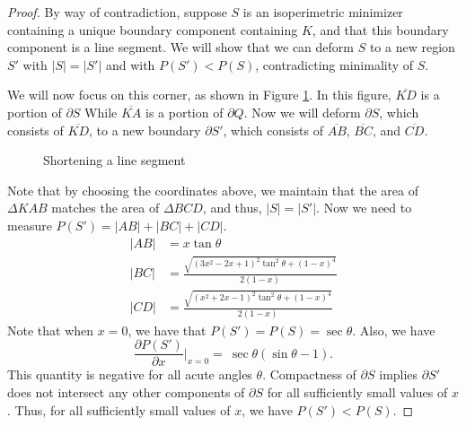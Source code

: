 \documentclass[leqno]{article}
\numberwithin{equation}{section}
\theoremstyle{definition}
\theoremstyle{remark}
\theoremstyle{plain}
\begin{document}
\begin{proof}

    By way of contradiction, suppose $S$ is an isoperimetric minimizer containing a unique boundary component containing $K$, and that this boundary component is a line segment.  We will show that we can deform $S$ to a new region $S'$ with $|S| = |S'|$ and with $P(S') < P(S)$, contradicting minimality of $S$.

    We will now focus on this corner, as shown in Figure \ref{fig:shortline}.  In this figure, $\overline{KD}$ is a portion of $\partial S$ While $\overline{KA}$ is a portion of $\partial Q$.   Now we will deform $\partial S$, which consists of $\overline{KD}$, to a new boundary $\partial S'$, which consists of $\overline{AB}$, $\overline{BC}$, and $\overline{CD}$.
\begin{figure}
    \begin{center}
        \caption{Shortening a line segment}\label{fig:shortline}
    \end{center}
\end{figure}

    Note that by choosing the coordinates above, we maintain that the area of $\Delta KAB$ matches the area of $\Delta BCD$, and thus, $|S| = |S'|$. Now we need to measure $P(S') = |AB| + |BC| + |CD|$.
    \begin{align*}
        |AB| &= x\tan \theta \\
        |BC| &= \frac{\sqrt{(3x^2-2x+1)^2 \tan^2\theta + (1-x)^4}}{2(1-x)} \\
        |CD| &= \frac{\sqrt{(x^2 + 2x - 1)^2\tan^2\theta + (1-x)^4}}{2(1-x)}
    \end{align*}
    Note that when $x=0$, we have that $P(S') = P(S) = \sec \theta$. Also, we have
    \[
        \frac{\partial P(S')}{\partial x}\Bigg|_{x=0} =\  \sec\theta (\sin\theta - 1).
    \]
    This quantity is negative for all acute angles $\theta$.  {\color{blue} Compactness of $\partial S$ implies $\partial S'$ does not intersect any other components of $\partial S$ for all sufficiently small values of $x$.}  Thus, for all sufficiently small values of $x$, we have  $P(S') < P(S)$.


\end{proof}
\end{document}
